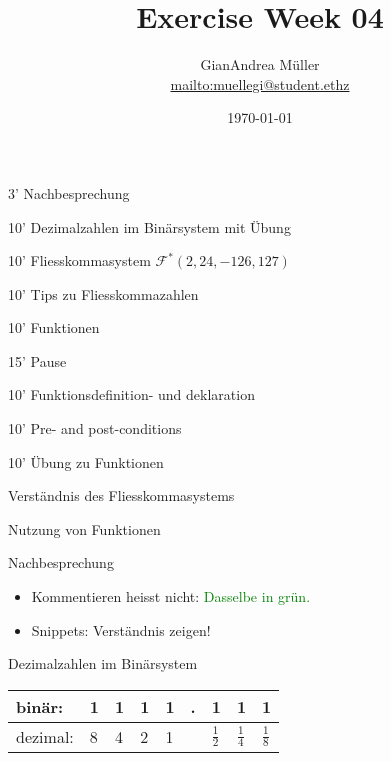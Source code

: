 \ifnum\conditionmacro=1 \documentclass[handout,usenames,dvipsnames]{beamer}\fi
\title{Exercise Week 04}
\author{GianAndrea Müller\\ \url{mailto:muellegi@student.ethz}}
\date{\today}
\begin{document}
\maketitle

\begin{TFTimeSchedule}
\item 3' Nachbesprechung 
\item 10' Dezimalzahlen im Binärsystem mit Übung
\item 10' Fliesskommasystem $\mathcal{F}^\ast(2,24,-126,127)$
\item 10' Tips zu Fliesskommazahlen
\item 10' Funktionen
\item 15' Pause
\item 10' Funktionsdefinition- und deklaration
\item 10' Pre- and post-conditions
\item 10' Übung zu Funktionen
\end{TFTimeSchedule}

\begin{TFLearningObjectives}
\item Verständnis des Fliesskommasystems
\item Nutzung von Funktionen
\end{TFLearningObjectives}

\begin{frame}{Nachbesprechung}
\begin{itemize}
\item Kommentieren heisst nicht: \textcolor{green}{Dasselbe in grün.}
\item Snippets: Verständnis zeigen!
\end{itemize}
\end{frame}


\begin{frame}{Dezimalzahlen im Binärsystem}
\begin{center}
\begin{tabular}{ll|l|l|l|l|l|l|l}
binär:&1&1&1&1&.&1&1&1\\\hline
dezimal:&8&4&2&1&&$\frac{1}{2}$&$\frac{1}{4}$&$\frac{1}{8}$
\end{tabular}
\end{center}
\end{frame}
\end{document}
